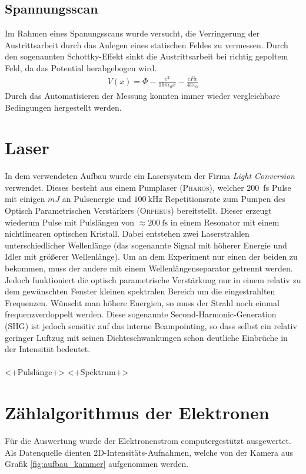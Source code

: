 \documentclass[bachelor,       %
               twoside,        %
               BCOR10mm,       %
               english,ngerman, %
               ]{GAUBM}
\begin{document}
\subsection{Spannungsscan}
Im Rahmen eines Spanungsscans wurde versucht, die Verringerung der Austrittsarbeit durch das Anlegen eines statischen Feldes zu vermessen.
Durch den sogenannten Schottky-Effekt \cite{schottky-paper} sinkt die Austrittsarbeit bei richtig gepoltem Feld, da das Potential herabgebogen wird.
\begin{align}
	V(x)=\Phi - \frac{e^2}{16\pi\epsilon_0x}-\frac{eFx}{4\pi\epsilon_0}
	\label{schottky-potential}
\end{align}
Durch das Automatisieren der Messung konnten immer wieder vergleichbare Bedingungen hergestellt werden.


\section{Laser}
In dem verwendeten Aufbau wurde ein Lasersystem der Firma \textit{Light Conversion} verwendet.
Dieses besteht aus einem Pumplaser (\textsc{Pharos}), welcher \SI{200}{\fs} Pulse mit einigen $\unit{mJ}$ an Pulsenergie und $\SI{100}{\kilo\hertz}$ Repetitionsrate zum Pumpen des Optisch Parametrischen Verstärkers (\textsc{Orpheus}) bereitstellt.
Dieser erzeugt wiederum Pulse mit Pulslängen von $\approx \SI{200}{\fs}$ in einem Resonator mit einem nichtlinearen optischen Kristall\cite{orpheus_tuningcurve}.
Dabei entstehen zwei Laserstrahlen unterschiedlicher Wellenlänge (das sogenannte Signal mit höherer Energie und Idler mit größerer Wellenlänge).
Um an dem Experiment nur einen der beiden zu bekommen, muss der andere mit einem Wellenlängenseparator getrennt werden.
Jedoch funktioniert die optisch parametrische Verstärkung nur in einem relativ zu dem gewünschten Fenster kleinen spektralen Bereich um die eingestrahlten Frequenzen.
Wünscht man höhere Energien, so muss der Strahl noch einmal frequenzverdoppelt werden.
Diese sogenannte Second-Harmonic-Generation (SHG) ist jedoch sensitiv auf das interne Beampointing, so dass selbst ein relativ geringer Luftzug mit seinen Dichteschwankungen schon deutliche Einbrüche in der Intensität bedeutet.\\\\



<+Pulslänge+>
<+Spektrum+>

\section{Zählalgorithmus der Elektronen}
\label{sec:zaehlalgorithmus}
Für die Auswertung wurde der Elektronenstrom computergestützt ausgewertet.
Als Datenquelle dienten 2D-Intensitäts-Aufnahmen, welche von der Kamera aus Grafik \ref{fig:aufbau_kammer} aufgenommen werden.
\end{document}
